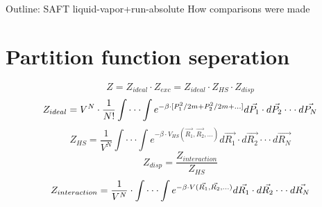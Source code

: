 Outline:
SAFT\newline
liquid-vapor+run-absolute\newline
How comparisons were made\newline
\section{Partition function seperation}
$$Z=Z_{ideal}\cdot Z_{exc}=Z_{ideal}\cdot Z_{HS}\cdot Z_{disp}$$
$$Z_{ideal}=V^N\cdot\frac{1}{N!}\int\cdot\cdot\cdot\int e^{-\beta\cdot [P_{1}^2/{2m}+P_{2}^2/{2m}+...]}d\vec{P_1}\cdot d\vec{P_2}\cdot\cdot\cdot d\vec{P_N}\newline$$
$$Z_{HS}=\frac{1}{V^N}\int\cdot\cdot\cdot\int e^{-\beta\cdot V_{HS}(\vec{R_1},\vec{R_2},...)}d\vec{R_1}\cdot d\vec{R_2}\cdot\cdot\cdot d\vec{R_N}$$
$$Z_{disp}= \frac{Z_{interaction}}{Z_{HS}}$$
$$Z_{interaction}=\frac{1}{V^N}\cdot \int\cdot\cdot\cdot\int e^{-\beta\cdot V(\vec{R_1},\vec{R_2},...)}d\vec{R_1}\cdot d\vec{R_2}\cdot\cdot\cdot d\vec{R_N}\newline$$


